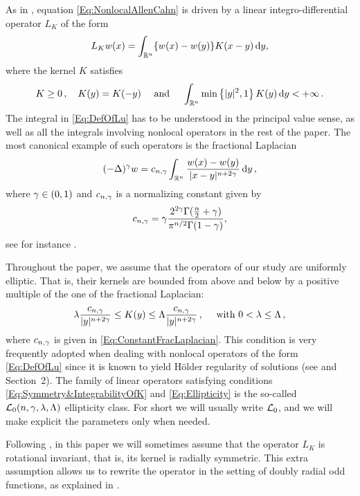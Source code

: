  
As in \cite{FelipeSanz-Perela:IntegroDifferentialI}, equation \eqref{Eq:NonlocalAllenCahn} is driven by a linear integro-differential operator $L_K$ of the form
\begin{equation}
\label{Eq:DefOfLu}
L_K w(x) = \int_{\mathbb{R}^n} \{w(x) - w(y)\} K(x-y)\,\mathrm{d} y,
\end{equation}
where the kernel $K$ satisfies
\begin{equation}
\label{Eq:Symmetry&IntegrabilityOfK}
K\geq 0\,, \quad K(y) = K(-y) \quad \textrm{ and } \quad \int_{\mathbb{R}^n} \min \left\{ |y|^2, 1 \right\} K(y) \,\mathrm{d} y < + \infty\,.
\end{equation}
The integral in \eqref{Eq:DefOfLu} has to be understood in the principal value sense, as well as all the integrals involving nonlocal operators in the rest of the paper.
The most canonical example of such operators is the fractional Laplacian
$$
(-\Delta)^\gamma w = c_{n, \gamma} \int_{\mathbb{R}^n} \dfrac{w(x) - w(y)}{|x-y|^{n + 2\gamma}}\,\mathrm{d} y\,,
$$
where $\gamma \in (0,1)$ and $c_{n, \gamma}$ is a normalizing constant given by
\begin{equation}
  \label{Eq:ConstantFracLaplacian}
  c_{n,\gamma} = \gamma\dfrac{2^{2\gamma} \Gamma(\frac{n}{2}+\gamma) }{\pi^{n/2} \Gamma(1-\gamma)},
\end{equation}
see for instance \cite{BucurValdinoci}.

Throughout the paper, we assume that the operators of our study are uniformly elliptic. That is, their kernels are bounded from above and below by a positive multiple of the one of the fractional Laplacian:
\begin{equation}
\label{Eq:Ellipticity}
\lambda \dfrac{c_{n,\gamma}}{|y|^{n+2\gamma}} \leq K(y) \leq \Lambda\dfrac{c_{n,\gamma}}{|y|^{n+2\gamma}}\,, \quad \text{ with }  0< \lambda \leq \Lambda \,,
\end{equation}
where $c_{n,\gamma}$ is given in \eqref{Eq:ConstantFracLaplacian}. This condition is very frequently adopted when dealing with nonlocal operators of the form \eqref{Eq:DefOfLu} since it is known to yield Hölder regularity of solutions (see \cite{RosOton-Survey,SerraC2s+alphaRegularity} and Section~2). The family of linear operators satisfying conditions \eqref{Eq:Symmetry&IntegrabilityOfK} and \eqref{Eq:Ellipticity} is the so-called $\mathcal{L}_0(n,\gamma,\lambda, \Lambda)$ ellipticity class. For short we will usually write $\mathcal{L}_0$, and we will make explicit the parameters only when needed.

Following \cite{FelipeSanz-Perela:IntegroDifferentialI}, in this paper we will sometimes assume that the operator $L_K$ is rotational invariant, that is, its kernel is radially symmetric. This extra assumption allows us to rewrite the operator in the setting of doubly radial odd functions, as explained in \cite{FelipeSanz-Perela:IntegroDifferentialI}.

